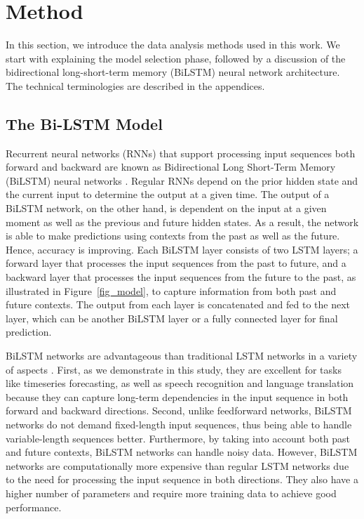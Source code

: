 \section{Method}
\label{sec_ch4_methods}
In this section, we introduce the data analysis methods used in this work. We start with explaining the model selection phase, followed by a discussion of the bidirectional long-short-term memory (BiLSTM) neural network architecture. The technical terminologies are described in the appendices.

\subsection{The Bi-LSTM Model}
Recurrent neural networks (RNNs) that support processing input sequences both forward and backward are known as Bidirectional Long Short-Term Memory (BiLSTM) neural networks \citep{schuster_1997}. Regular RNNs \citep{hochreiter_1997, kolen_2001} depend on the prior hidden state and the current input to determine the output at a given time. The output of a BiLSTM network, on the other hand, is dependent on the input at a given moment as well as the previous and future hidden states. As a result, the network is able to make predictions using contexts from the past as well as the future. Hence, accuracy is improving.
Each BiLSTM layer consists of two LSTM layers; a forward layer that processes the input sequences from the past to future, and a backward layer that processes the input sequences from the future to the past, as illustrated in Figure~\ref{fig_model}, to capture information from both past and future contexts. The output from each layer is concatenated and fed to the next layer, which can be another BiLSTM layer or a fully connected layer for final prediction.

BiLSTM networks are advantageous than traditional LSTM networks in a variety of aspects \citep{graves_2005, ihianle_2020, alharbi_2021}. First, as we demonstrate in this study, they are excellent for tasks like timeseries forecasting, as well as speech recognition and language translation \citep{wollmer_2013, graves_2014, sundermeyer_2014, huang_2018, nammous_2022} because they can capture long-term dependencies in the input sequence in both forward and backward directions. Second, unlike feedforward networks, BiLSTM networks do not demand fixed-length input sequences, thus being able to handle variable-length sequences better. Furthermore, by taking into account both past and future contexts, BiLSTM networks can handle noisy data.
However, BiLSTM networks are computationally more expensive than regular LSTM networks due to the need for processing the input sequence in both directions. They also have a higher number of parameters and require more training data to achieve good performance.

